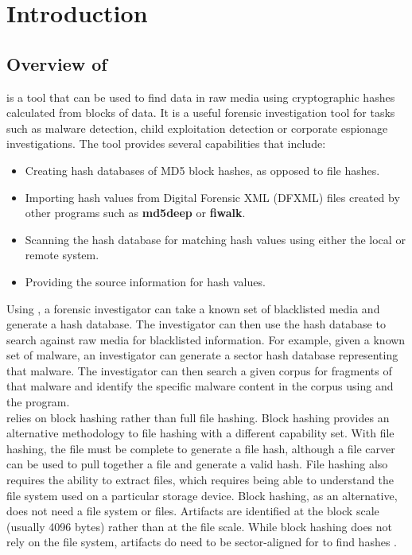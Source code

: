 \documentclass[11pt,fleqn]{article} %
\begin{document}
\newpage


\tableofcontents
\newpage
{}





\newpage

\section{Introduction}
\subsection {Overview of \hash}
\hash is a tool that can be used to find data in raw media using cryptographic hashes calculated from blocks of data. It is a useful forensic investigation tool for tasks such as malware detection, child exploitation detection or corporate espionage investigations. The tool provides several capabilities that include:
\begin{itemize}
\item Creating hash databases of MD5 block hashes, as opposed to file hashes.
\item Importing hash values from Digital Forensic XML (DFXML) files created by other programs such as \textbf{md5deep} or \textbf{fiwalk}.
\item Scanning the hash database for matching hash values using either the local or remote system. 
\item Providing the source information for hash values. 
\end{itemize}

Using \hash, a forensic investigator can take a known set of blacklisted media and generate a hash database. The investigator can then use the hash database to search against raw media for blacklisted information. For example, given a known set of malware, an investigator can generate a sector hash database representing that malware. The investigator can then search a given corpus for fragments of that malware and identify the specific malware content in the corpus using \hash and the \bulk program. \\

\hash relies on block hashing rather than full file hashing. Block hashing provides an alternative methodology to file hashing with a different capability set. With file hashing, the file must be complete to generate a file hash, although a file carver can be used to pull together a file and generate a valid hash.  File hashing also requires the ability to extract files, which requires being able to understand the file system used on a particular storage device. Block hashing, as an alternative, does not need a file system or files. Artifacts are identified at the block scale (usually 4096 bytes) rather than at the file scale. While block hashing does not rely on the file system, artifacts do need to be sector-aligned for \hash to find hashes \cite{hashEncoding}.\\
\end{document}
